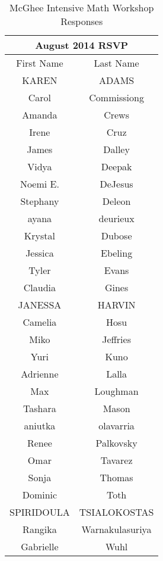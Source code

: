 \documentclass[12pt,dvipsnames]{article}
\begin{document}
	
        \begin{table}
       	\footnotesize
\caption*{McGhee Intensive Math Workshop Responses}
		\begin{tabular}{|c|c|}
			\multicolumn{2}{c}{\bfseries August 2014 RSVP}\\\hline
			First Name & Last Name\\ 
			\hline
			KAREN  & ADAMS\\ 
\hline
Carol  & Commissiong\\ 
\hline
Amanda  & Crews\\ 
\hline
Irene  & Cruz\\ 
\hline
James  & Dalley\\ 
\hline
Vidya  & Deepak\\ 
\hline
Noemi E.  & DeJesus\\ 
\hline
Stephany  & Deleon\\ 
\hline
ayana  & deurieux\\ 
\hline
Krystal & Dubose\\ 
\hline
Jessica & Ebeling\\ 
\hline
Tyler  & Evans\\ 
\hline
Claudia  & Gines\\ 
\hline
JANESSA  & HARVIN\\ 
\hline
Camelia & Hosu\\ 
\hline
Miko  & Jeffries\\ 
\hline
Yuri & Kuno\\ 
\hline
Adrienne  & Lalla\\ 
\hline
Max  & Loughman\\ 
\hline
Tashara  & Mason\\ 
\hline
aniutka  & olavarria\\ 
\hline
Renee  & Palkovsky\\ 
\hline
Omar  & Tavarez\\ 
\hline
Sonja  & Thomas\\ 
\hline
Dominic  & Toth\\ 
\hline
SPIRIDOULA & TSIALOKOSTAS\\ 
\hline
Rangika  & Warnakulasuriya\\ 
\hline
Gabrielle  & Wuhl\\ 
			\hline\end{tabular}
 \hfill

\end{table}
\end{document}
